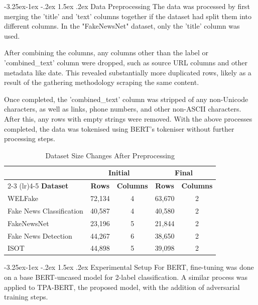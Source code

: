 \documentclass[
]{article}
\makeatletter
\renewcommand\subsection{\@startsection{subsection}{2}{\z@}%
  {-3.25ex\@plus -1ex \@minus -.2ex}%
  {1.5ex \@plus .2ex}%
  {\normalfont\fontsize{10}{12}\selectfont\bfseries}}
\makeatother
\begin{document}
\subsection{Data Preprocessing}
The data was processed by first merging the 'title' and 'text' columns together if the dataset had split them into different columns. In the "FakeNewsNet" dataset, only the 'title' column was used. 

After combining the columns, any columns other than the label or 'combined\_text' column were dropped, such as source URL columns and other metadata like date. This revealed substantially more duplicated rows, likely as a result of the gathering methodology scraping the same content.

Once completed, the 'combined\_text' column was stripped of any non-Unicode characters, as well as links, phone numbers, and other non-ASCII characters. After this, any rows with empty strings were removed. With the above processes completed, the data was tokenised using BERT's tokeniser without further processing steps.

\begin{table}[H]
    \centering
    \caption{Dataset Size Changes After Preprocessing}
    \label{tab:dataset_shapes}
    \begin{tabular}{l cc cc}
        \toprule
        & \multicolumn{2}{c}{\textbf{Initial}} & \multicolumn{2}{c}{\textbf{Final}} \\
        \cmidrule(lr){2-3} \cmidrule(lr){4-5}
        \textbf{Dataset} & \textbf{Rows} & \textbf{Columns} & \textbf{Rows} & \textbf{Columns} \\
        \midrule
        WELFake & 72,134 & 4 & 63,670 & 2 \\
        Fake News Classification & 40,587 & 4 & 40,580 & 2 \\
        FakeNewsNet & 23,196 & 5 & 21,844 & 2 \\
        Fake News Detection & 44,267 & 6 & 38,650 & 2 \\
        ISOT & 44,898 & 5 & 39,098 & 2 \\
        \bottomrule
    \end{tabular}
\end{table}

\subsection{Experimental Setup}
For BERT, fine-tuning was done on a base BERT-uncased model for 2-label classification. A similar process was applied to TPA-BERT, the proposed model, with the addition of adversarial training steps.
\end{document}
